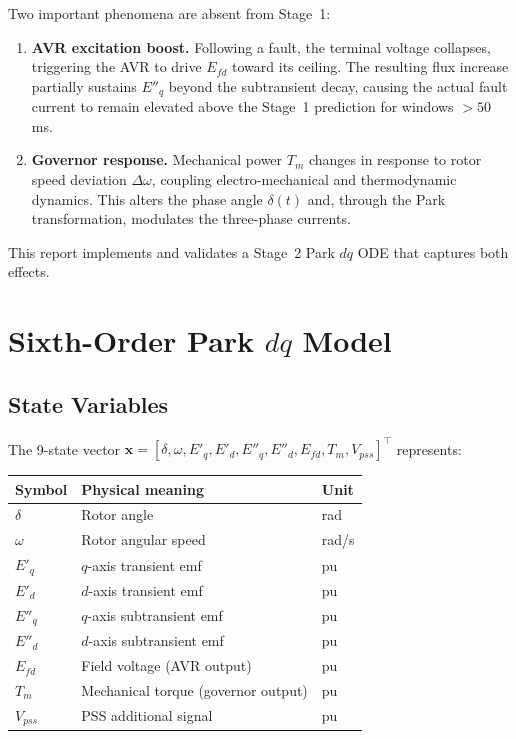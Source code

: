 \documentclass[12pt,a4paper]{article}
\theoremstyle{definition}
\theoremstyle{plain}
\newcommand{\vect}[1]{\bm{#1}}
\begin{document}
Two important phenomena are absent from Stage~1:
\begin{enumerate}
  \item \textbf{AVR excitation boost.} Following a fault, the terminal voltage
        collapses, triggering the AVR to drive $E_{fd}$ toward its ceiling.
        The resulting flux increase partially sustains $E''_q$ beyond the
        subtransient decay, causing the actual fault current to remain
        elevated above the Stage~1 prediction for windows $> 50$\,ms.
  \item \textbf{Governor response.} Mechanical power $T_m$ changes in response
        to rotor speed deviation $\Delta\omega$, coupling electro-mechanical and
        thermodynamic dynamics.  This alters the phase angle $\delta(t)$ and,
        through the Park transformation, modulates the three-phase currents.
\end{enumerate}

This report implements and validates a Stage~2 Park $dq$ ODE that captures
both effects.

\section{Sixth-Order Park $dq$ Model}
\label{sec:model}

\subsection{State Variables}
\label{sec:model:states}

The 9-state vector $\vect{x} = [\delta, \omega, E'_q, E'_d, E''_q, E''_d,
E_{fd}, T_m, V_{pss}]^\top$ represents:

\begin{center}
\small
\begin{tabular}{lll}
  \toprule
  Symbol & Physical meaning & Unit \\
  \midrule
  $\delta$ & Rotor angle & rad \\
  $\omega$ & Rotor angular speed & rad/s \\
  $E'_q$ & $q$-axis transient emf & pu \\
  $E'_d$ & $d$-axis transient emf & pu \\
  $E''_q$ & $q$-axis subtransient emf & pu \\
  $E''_d$ & $d$-axis subtransient emf & pu \\
  $E_{fd}$ & Field voltage (AVR output) & pu \\
  $T_m$ & Mechanical torque (governor output) & pu \\
  $V_{pss}$ & PSS additional signal & pu \\
  \bottomrule
\end{tabular}
\end{center}
\end{document}
